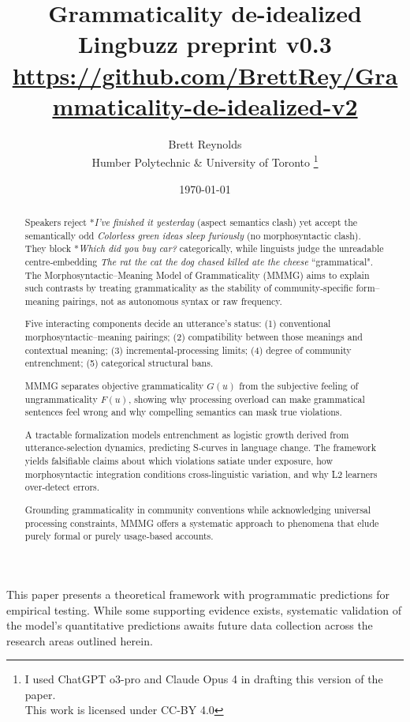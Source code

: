 \documentclass[12pt]{article}
\title{Grammaticality de-idealized\\[4pt]
       \large Lingbuzz preprint v0.3\\[6pt]
       \normalsize \url{https://github.com/BrettRey/Grammaticality-de-idealized-v2}}
\author{Brett Reynolds \orcidlink{0000-0003-0073-7195}\\Humber Polytechnic \& University of Toronto
\thanks{I used ChatGPT o3-pro and Claude Opus 4 in drafting this version of the paper.\\This work is licensed under CC-BY 4.0}}
\date{\today}
\begin{document}
\maketitle

\begin{abstract}
\small
Speakers reject *\textit{I've finished it yesterday} (aspect semantics clash) yet accept the semantically odd \textit{Colorless green ideas sleep furiously} (no morphosyntactic clash). They block *\textit{Which did you buy car?} categorically, while linguists judge the unreadable centre‑embedding \textit{The rat the cat the dog chased killed ate the cheese} ``grammatical".  
The Morphosyntactic–Meaning Model of Grammaticality (MMMG) aims to explain such contrasts by treating grammaticality as the stability of community‑specific form–meaning pairings, not as autonomous syntax or raw frequency.

Five interacting components decide an utterance's status:  
(1) conventional morphosyntactic--meaning pairings;  
(2) compatibility between those meanings and contextual meaning;  
(3) incremental‑processing limits;  
(4) degree of community entrenchment;  
(5) categorical structural bans.

MMMG separates objective grammaticality \(G(u)\) from the subjective feeling of ungrammaticality \(F(u)\), showing why processing overload can make grammatical sentences feel wrong and why compelling semantics can mask true violations.  

A tractable formalization models entrenchment as logistic growth derived from utterance-selection dynamics, predicting S‑curves in language change. The framework yields falsifiable claims about which violations satiate under exposure, how morphosyntactic integration conditions cross‑linguistic variation, and why L2 learners over‑detect errors.  

Grounding grammaticality in community conventions while acknowledging universal processing constraints, MMMG offers a systematic approach to phenomena that elude purely formal or purely usage‑based accounts.
\end{abstract}

\begin{tcolorbox}[colback=lsLightBlue!20,title=Research Programme]
This paper presents a theoretical framework with programmatic predictions for empirical testing. While some supporting evidence exists, systematic validation of the model's quantitative predictions awaits future data collection across the research areas outlined herein.
\end{tcolorbox}
\end{document}
